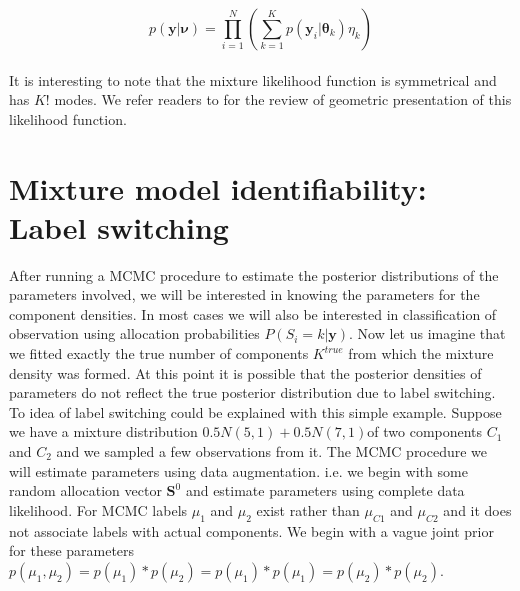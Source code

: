 $$p(\boldsymbol{y}|\boldsymbol{\nu}) = \prod_{i=1}^{N} (\sum_{k=1}^{K} p(\boldsymbol{y}_i | \boldsymbol{\theta}_k) \eta_k)$$\\

It is interesting to note that the mixture likelihood function is symmetrical and has $K!$ modes. We refer readers to \citet[pg. 45-46]{fruhwirth-schnatter_finite_2013} for the review of geometric presentation of this likelihood function.\\

\section{Mixture model identifiability: Label switching}
After running a MCMC procedure to estimate the posterior distributions of the parameters involved, we will be interested in knowing the parameters for the component densities. In most cases we will also be interested in classification of observation using allocation probabilities $P(S_i = k | \boldsymbol{y})$. Now let us imagine that we fitted exactly the true number of components $K^{true}$ from which the mixture density was formed. At this point it is possible that the posterior densities of parameters do not reflect the true posterior distribution due to label switching.\\

To idea of label switching could be explained with this simple example. Suppose we have a mixture distribution $0.5N(5,1) + 0.5N(7,1)$of two components $C_1$ and $C_2$ and we sampled a few observations from it. The MCMC procedure we will estimate parameters using data augmentation. i.e. we begin with some random allocation vector $\boldsymbol{S}^0$ and estimate parameters using complete data likelihood. For MCMC labels $\mu_1$ and $\mu_2$ exist rather than  $\mu_{C1}$ and $\mu_{C2}$ and it does not associate labels with actual components. We begin with a vague joint prior for these parameters $p(\mu_1, \mu_2) = p(\mu_1)*p(\mu_2) = p(\mu_1)*p(\mu_1) = p(\mu_2)*p(\mu_2)$.\\

